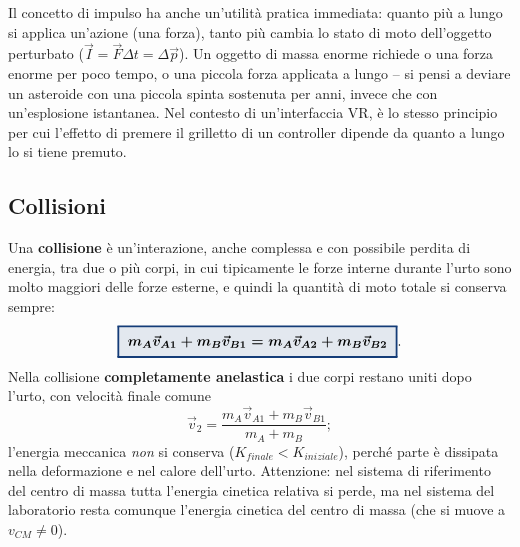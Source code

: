 \documentclass[a4paper,11pt]{article}
\newcommand{\keyeq}[1]{{\setlength{\fboxsep}{6pt}\setlength{\fboxrule}{1.3pt}\fcolorbox{chapblue}{chapblue!12}{\boldmath$\displaystyle #1$}}}
\begin{document}
\begin{center}
\end{center}

Il concetto di impulso ha anche un'utilità pratica immediata: quanto più a lungo si applica un'azione (una forza), tanto più cambia lo stato di moto dell'oggetto perturbato ($\vec I=\vec F\Delta t=\Delta\vec p$). Un oggetto di massa enorme richiede o una forza enorme per poco tempo, o una piccola forza applicata a lungo -- si pensi a deviare un asteroide con una piccola spinta sostenuta per anni, invece che con un'esplosione istantanea. Nel contesto di un'interfaccia VR, è lo stesso principio per cui l'effetto di premere il grilletto di un controller dipende da quanto a lungo lo si tiene premuto.

\subsection{Collisioni}

Una \textbf{collisione} è un'interazione, anche complessa e con possibile perdita di energia, tra due o più corpi, in cui tipicamente le forze interne durante l'urto sono molto maggiori delle forze esterne, e quindi la quantità di moto totale si conserva sempre:
\[
\keyeq{m_A\vec v_{A1}+m_B\vec v_{B1} = m_A\vec v_{A2}+m_B\vec v_{B2}}.
\]
Nella collisione \textbf{completamente anelastica} i due corpi restano uniti dopo l'urto, con velocità finale comune
\[
\vec v_2 = \frac{m_A\vec v_{A1}+m_B\vec v_{B1}}{m_A+m_B};
\]
l'energia meccanica \emph{non} si conserva ($K_{finale}<K_{iniziale}$), perché parte è dissipata nella deformazione e nel calore dell'urto. Attenzione: nel sistema di riferimento del centro di massa tutta l'energia cinetica relativa si perde, ma nel sistema del laboratorio resta comunque l'energia cinetica del centro di massa (che si muove a $v_{CM}\neq0$).
\end{document}
